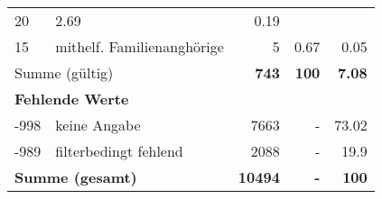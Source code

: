 \begin{longtable}{lXrrr}
       \num{20} &
       \num[round-mode=places,round-precision=2]{2.69} &
         \num[round-mode=places,round-precision=2]{0.19} \\

     15 &
     \multicolumn{1}{X}{ mithelf. Familienanghörige   } &


       \num{5} &
       \num[round-mode=places,round-precision=2]{0.67} &
         \num[round-mode=places,round-precision=2]{0.05} \\
     \midrule
     \multicolumn{2}{l}{Summe (gültig)} &
       \textbf{\num{743}} &
     \textbf{\num{100}} &
       \textbf{\num[round-mode=places,round-precision=2]{7.08}} \\
     \multicolumn{5}{l}{\textbf{Fehlende Werte}}\\
       -998 &
       keine Angabe &
         \num{7663} &
        - &
         \num[round-mode=places,round-precision=2]{73.02} \\
       -989 &
       filterbedingt fehlend &
         \num{2088} &
        - &
         \num[round-mode=places,round-precision=2]{19.9} \\
     \midrule
     \multicolumn{2}{l}{\textbf{Summe (gesamt)}} &
          \textbf{\num{10494}} &
        \textbf{-} &
        \textbf{\num{100}} \\
     \bottomrule
     \end{longtable}
     
